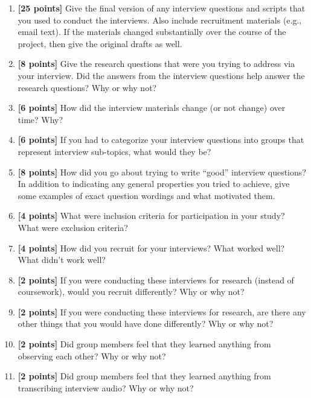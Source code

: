 \documentclass{article}
\begin{document}
\begin{enumerate}
    \item \textbf{[25 points]} Give the final version of any interview questions and scripts that you used to conduct the interviews. Also include recruitment materials (e.g., email text). If the materials changed substantially over the course of the project, then give the original drafts as well.
    
    \item \textbf{[8 points]} Give the research questions that were you trying to address via your interview. Did the answers from the interview questions help answer the research questions? Why or why not?
    
    \item \textbf{[6 points]} How did the interview materials change (or not change) over time? Why?
    
    \item \textbf{[6 points]} If you had to categorize your interview questions into groups that represent interview sub-topics, what would they be?
    
    \item \textbf{[8 points]} How did you go about trying to write ``good'' interview questions? In addition to indicating any general properties you tried to achieve, give some examples of exact question wordings and what motivated them.

    
    \item \textbf{[4 points]} What were inclusion criteria for participation in your study? What were exclusion criteria?
    
    \item \textbf{[4 points]} How did you recruit for your interviews? What worked well? What didn't work well?
    
    \item \textbf{[2 points]} If you were conducting these interviews for research (instead of coursework), would you recruit differently? Why or why not?
    
    \item \textbf{[2 points]} If you were conducting these interviews for research, are there any other things that you would have done differently? Why or why not?
    
    \item \textbf{[2 points]} Did group members feel that they learned anything from observing each other? Why or why not?
    
    \item \textbf{[2 points]} Did group members feel that they learned anything from transcribing interview audio? Why or why not?


\end{enumerate}
\end{document}
